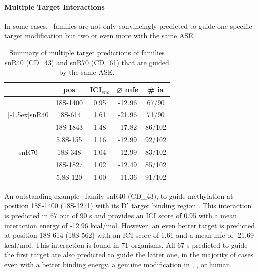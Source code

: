\paragraph{\textbf{Multiple Target Interactions}}
In some cases, \sno\ families are not only convincingly predicted to guide
one specific target modification but two or even more with the same ASE.
\begin{table}
  \caption{Summary of multiple target predictions of families 
    snR40 (CD\_43) and snR70 (CD\_61) that are guided by the same ASE.}
  \label{tab:redundant_predictions}
  \begin{center}
    \begin{footnotesize}
      \begin{tabular}{c|c|c|c|c}
        &pos&ICI$_{sno}$&$\varnothing$
          mfe&\# ia\\
        \hline
        &18S-1400&0.95&-12.96&67/90\\
        \raisebox{1.5ex}[-1.5ex]{snR40}&18S-614&1.61&-21.96&71/90\\
        \hline
        &18S-1843&1.48&-17.82&86/102\\
        &5.8S-155&1.16&-12.99&92/102\\
        snR70&18S-348&1.04&-12.99&83/102\\
        &18S-1827&1.02&-12.49&85/102\\
        &5.8S-120&1.00&-11.36&91/102\\
      \end{tabular}
    \end{footnotesize}
  \end{center}
\end{table}
An outstanding example  \cd\ family snR40 (CD\_43),  to guide methylation at position 18S-1400 (18S-1271) with its
D' target binding region \cite{Lowe:1999}. This interaction is predicted in
67 out of 90 \sno s and provides an ICI score of 0.95 with a mean
interaction energy of -12.96 kcal/mol. However, an even better target is
predicted at position 18S-614 (18S-562) with an ICI score of 1.61 and a
mean mfe of -21.69 kcal/mol. This interaction is found in 71 organisms. All
67 \sno s predicted to guide the first target are also predicted to guide
the latter one, in the  majority of cases even with a
better binding energy.  a genuine modification  in \sce, \ncr, or human. 

